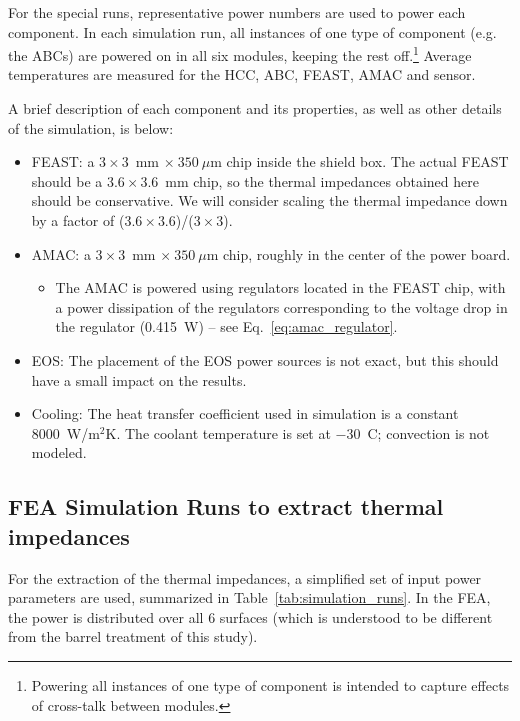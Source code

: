 For the special runs,
representative power numbers are used to power each component. In each simulation run, all instances
of one type of component (e.g. the ABCs) are powered on in all six modules, keeping the rest
off.\footnote{Powering all instances of one type of component is intended to capture effects of
cross-talk between modules.}
Average temperatures are measured for the HCC, ABC, FEAST, AMAC and sensor.

\def\thcc{\ensuremath{\overline{T}_\text{nHCC}}}
\def\tabc{\ensuremath{\overline{T}_\text{nABC}}}
\def\tfeast{\ensuremath{\overline{T}_\text{FEAST}}}
\def\tsensor{\ensuremath{T_\text{sensor}}}
\def\Rm{\ensuremath{{\text{R}m}}}

A brief description of each component and its properties, as well as other details
of the simulation, is below:
\begin{itemize}
\item FEAST: a $3\times3$~mm $\times~350~\mu$m chip inside the shield box. The actual FEAST should be
a $3.6\times3.6$~mm chip, so the thermal impedances obtained here should be conservative. We will 
consider scaling the thermal impedance down by a factor of ($3.6\times3.6$)/($3\times3$).
\item AMAC: a $3\times3$~mm $\times~350~\mu$m chip, roughly in the center of the power board.
  \begin{itemize}
    \item The AMAC is powered using regulators located in the FEAST chip, with a power dissipation
      of the regulators corresponding to the voltage drop in the regulator (0.415~W) -- see Eq.~\ref{eq:amac_regulator}.
  \end{itemize}
\item EOS: The placement of the EOS power sources is not exact, but this should have a small impact
  on the results.
\item Cooling: The heat transfer coefficient used in simulation is a constant 8000~W/m$^{2}$K.
  The coolant temperature is set at $-30$~C; convection is not modeled.
\end{itemize}




\subsection{FEA Simulation Runs to extract thermal impedances}

For the extraction of the thermal impedances, a simplified set of input power parameters are used,
summarized in Table~\ref{tab:simulation_runs}.
In the FEA, the power is distributed over all 6 surfaces (which is understood to be different from
the barrel treatment of this study).

